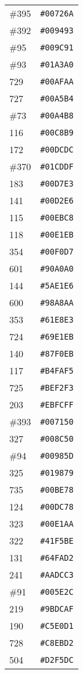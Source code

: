 \documentclass[a4paper]{article}
\begin{document}
\begin{longtable}{|l|r|}
\#395 & \texttt{\#00726A} \\
\#392 & \texttt{\#009493} \\
\#95 & \texttt{\#009C91} \\
\#93 & \texttt{\#01A3A0} \\
729 & \texttt{\#00AFAA} \\
727 & \texttt{\#00A5B4} \\
\#73 & \texttt{\#00A4B8} \\
116 & \texttt{\#00C8B9} \\
172 & \texttt{\#00DCDC} \\
\#370 & \texttt{\#01CDDF} \\
183 & \texttt{\#00D7E3} \\
141 & \texttt{\#00D2E6} \\
115 & \texttt{\#00EBC8} \\
118 & \texttt{\#00E1EB} \\
354 & \texttt{\#00F0D7} \\
601 & \texttt{\#90A0A0} \\
144 & \texttt{\#5AE1E6} \\
600 & \texttt{\#98A8AA} \\
353 & \texttt{\#61E8E3} \\
724 & \texttt{\#69E1EB} \\
140 & \texttt{\#87F0EB} \\
117 & \texttt{\#B4FAF5} \\
725 & \texttt{\#BEF2F3} \\
203 & \texttt{\#EBFCFF} \\
\#393 & \texttt{\#007150} \\
327 & \texttt{\#008C50} \\
\#94 & \texttt{\#00985D} \\
325 & \texttt{\#019879} \\
735 & \texttt{\#00BE78} \\
124 & \texttt{\#00DC78} \\
323 & \texttt{\#00E1AA} \\
322 & \texttt{\#41F5BE} \\
131 & \texttt{\#64FAD2} \\
241 & \texttt{\#AADCC3} \\
\#91 & \texttt{\#005E2C} \\
219 & \texttt{\#9BDCAF} \\
190 & \texttt{\#C5E0D1} \\
728 & \texttt{\#C8EBD2} \\
504 & \texttt{\#D2F5DC} \\

\end{longtable}
\end{document}
